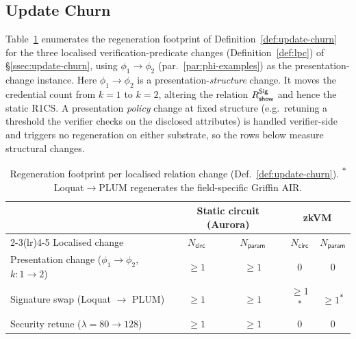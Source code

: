 \subsection{Update Churn}\label{ssec:churn-eval}
Table~\ref{tab:churn} enumerates the regeneration footprint of Definition~\ref{def:update-churn} for the three localised verification-predicate changes (Definition~\ref{def:lpc}) of \S\ref{ssec:update-churn}, using $\phi_1\!\to\!\phi_2$ (par.~\ref{par:phi-examples}) as the presentation-change instance. Here $\phi_1\!\to\!\phi_2$ is a presentation-\emph{structure} change. It moves the credential count from $k{=}1$ to $k{=}2$, altering the relation $R_{\mathsf{show}}^{\mathsf{Sig}}$ and hence the static R1CS. A presentation \emph{policy} change at fixed structure (e.g.\ retuning a threshold the verifier checks on the disclosed attributes) is handled verifier-side and triggers no regeneration on either substrate, so the rows below measure structural changes.

\begin{table}[H]
\centering
\small
\begin{tabular}{lcccc}
\toprule
& \multicolumn{2}{c}{Static circuit (Aurora)} & \multicolumn{2}{c}{zkVM} \\
\cmidrule(lr){2-3}\cmidrule(lr){4-5}
Localised change & $N_{\mathsf{circ}}$ & $N_{\mathsf{param}}$ & $N_{\mathsf{circ}}$ & $N_{\mathsf{param}}$ \\
\midrule
Presentation change ($\phi_1\!\to\!\phi_2$, $k{:}1{\to}2$) & $\geq 1$ & $\geq 1$ & $0$ & $0$ \\
Signature swap (Loquat $\to$ PLUM)              & $\geq 1$ & $\geq 1$ & $\geq 1$\textsuperscript{$\ast$} & $\geq 1$\textsuperscript{$\ast$} \\
Security retune ($\lambda{=}80\to128$)          & $\geq 1$ & $\geq 1$ & $0$ & $0$ \\
\bottomrule
\end{tabular}
\caption{Regeneration footprint per localised relation change
(Def.~\ref{def:update-churn}). \textsuperscript{$\ast$}Loquat$\to$PLUM
regenerates the field-specific Griffin AIR.}
\label{tab:churn}
\end{table}

